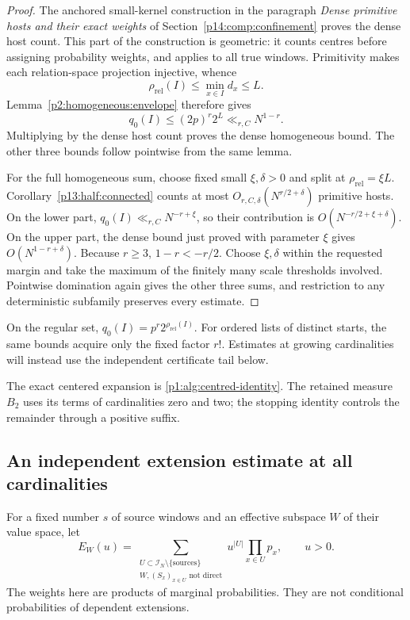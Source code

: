 \begin{proof}
The anchored small-kernel construction in the paragraph
\emph{Dense primitive hosts and their exact weights} of
Section~\ref{p14:comp:confinement} proves the dense host count.
This part of the construction is geometric: it counts centres before
assigning probability weights, and applies to all true windows.
Primitivity makes each relation-space projection injective, whence
\[
 \rho_{\mathrm{rel}}(I)\le\min_{x\in I}d_x\le L.
\]
Lemma~\ref{p2:homogeneous:envelope} therefore gives
\[
 q_0(I)\le(2p)^r2^L\ll_{r,C}N^{1-r}.
\]
Multiplying by the dense host count proves the dense homogeneous bound.
The other three bounds follow pointwise from the same lemma.

For the full homogeneous sum, choose fixed small $\xi,\delta>0$ and
split at $\rho_{\mathrm{rel}}=\xi L$.
Corollary~\ref{p13:half:connected} counts at most
$O_{r,C,\delta}(N^{r/2+\delta})$ primitive hosts.
On the lower part,
$q_0(I)\ll_{r,C}N^{-r+\xi}$, so their contribution is
$O(N^{-r/2+\xi+\delta})$.
On the upper part, the dense bound just proved with parameter $\xi$
gives $O(N^{1-r+\delta})$.
Because $r\ge3$, $1-r<-r/2$.
Choose $\xi,\delta$ within the requested margin and take the maximum
of the finitely many scale thresholds involved. Pointwise domination
again gives the other three sums, and restriction to any deterministic
subfamily preserves every estimate.
\end{proof}

On the regular set, $q_0(I)=p^r2^{\rho_{\mathrm{rel}}(I)}$.
For ordered lists of distinct starts, the same bounds acquire only the
fixed factor $r!$. Estimates at growing cardinalities will instead use
the independent certificate tail below.


The exact centered expansion is
\eqref{p1:alg:centred-identity}. The retained measure $B_2$ uses its
terms of cardinalities zero and two; the stopping identity controls
the remainder through a positive suffix.

\subsection{An independent extension estimate at all cardinalities}

For a fixed number $s$ of source windows and an effective subspace $W$
of their value space, let
\[
 E_W(u)=\sum_{\substack{U\subset\mathcal I_N\setminus\{\text{sources}\}\\
                      W,(S_x)_{x\in U}\text{ not direct}}}
                 u^{|U|}\prod_{x\in U}p_x,
 \qquad u>0.
\]
The weights here are products of marginal probabilities. They are not
conditional probabilities of dependent extensions.

